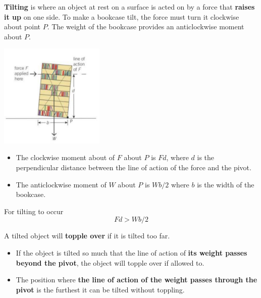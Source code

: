 \textbf{Tilting} is where an object at rest on a surface is acted on by a force that \textbf{raises it up} on one side. To make a bookcase tilt, the force must turn it clockwise about point $P$. The weight of the bookcase provides an anticlockwise moment about $P$.
\begin{center}
    \includegraphics[width=5cm]{img/tilting}
\end{center}
\begin{itemize}
    \item The clockwise moment about of $F$ about $P$ is $Fd$, where $d$ is the perpendicular distance between the line of action of the force and the pivot.
    \item The anticlockwise moment of $W$ about $P$ is $Wb/2$ where $b$ is the width of the bookcase.
\end{itemize}

For tilting to occur
$$Fd>Wb/2$$

A tilted object will \textbf{topple over} if it is tilted too far.
\begin{itemize}
    \item If the object is tilted so much that the line of action of \textbf{its weight passes beyond the pivot}, the object will topple over if allowed to.
    \item The position where \textbf{the line of action of the weight passes through the pivot} is the furthest it can be tilted without toppling.
\end{itemize}
